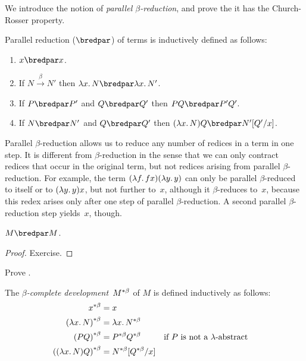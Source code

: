 \documentclass[../../../include/open-logic-section]{subfiles}
\begin{document}


We introduce the notion of \emph{parallel $\beta$-reduction}, and
prove the it has the Church-Rosser property.

\begin{defn} 
  Parallel reduction ($\bredpar$) of terms is inductively defined as follows:
  \begin{enumerate}
    \item {} $x \bredpar x$.
    \item {} If $N \xrightarrow{\beta} N'$ then $\lambd[x][N] \bredpar
      \lambd[x][N']$.
    \item {} If $P \bredpar P'$ and $Q \bredpar Q'$ then $PQ \bredpar
      P'Q'$.
    \item {} If $N \bredpar N'$ and $Q \bredpar Q'$ then
      $(\lambd[x][N])Q \bredpar \Subst{N'}{Q'}{x}$.
  \end{enumerate}
\end{defn}

Parallel $\beta$-reduction allows us to reduce any number of redices in a
term in one step. It is different from $\beta$-reduction in the sense that we
can only contract redices that occur in the original term, but not redices
arising from parallel $\beta$-reduction. For example, the term
$(\lambd[f][fx])(\lambd[y][y])$ can only be parallel $\beta$-reduced
to itself or to $(\lambd[y][y])x$, but not further to~$x$, although it
$\beta$-reduces to~$x$, because this redex arises only after one step 
of parallel $\beta$-reduction. A second parallel $\beta$-reduction
step yields~$x$, though.

\begin{thm}
  $M \bredpar M$.
\end{thm}

\begin{proof}
  Exercise.
\end{proof}

\begin{prob}
  Prove .
\end{prob}

\begin{defn}
  The \emph{$\beta$-complete development}~$\bcd{M}$ of $M$ is defined
  inductively as follows:
  \begin{align}
    \bcd{x} &= x \ollabel{defn:bcd1} \\
    \bcd{(\lambd[x][N])} &= \lambd[x][\bcd{N}] \ollabel{defn:bcd2}\\
    \bcd{(PQ)} &= \bcd{P}\bcd{Q} && \text{if $P$ is not a $\lambd$-abstract} 
    \ollabel{defn:bcd3} \\
    \bcd{((\lambd[x][N])Q)} &= \Subst{\bcd{N}}{\bcd{Q}}{x} \ollabel{defn:bcd4}
  \end{align}
\end{defn}
\end{document}
